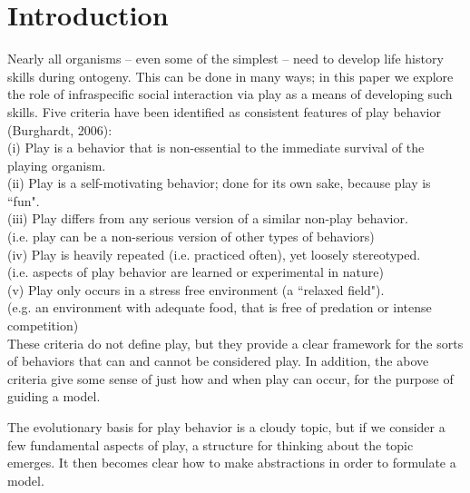 \documentclass[12pt, letterpaper, fleqn]{article}
\begin{document}
\newpage
\section*{Introduction}

\indent
Nearly all organisms -- even some of the simplest -- need to develop life history skills during ontogeny.    This can be done in many ways; in this paper we explore the role of infraspecific social interaction via play as a means of developing such skills. Five criteria have been identified as consistent features of play behavior (Burghardt, 2006): \\[6pt]
(i) Play is a behavior that is non-essential to the immediate survival of the playing organism.\\[.5pt]
(ii) Play is a self-motivating behavior; done for its own sake, because play is ``fun". \\[.5pt]
(iii) Play differs from any serious version of a similar non-play behavior.\\[.1pt]
\indent (i.e. play can be a non-serious version of other types of behaviors) \\[.5pt]
(iv) Play is heavily repeated (i.e. practiced often), yet loosely stereotyped.\\[.1pt]
\indent (i.e. aspects of play behavior are learned or experimental in nature)\\ [.5pt]
(v) Play only occurs in a stress free environment (a ``relaxed field").\\[.1pt] 
\indent (e.g. an environment with adequate food, that is free of predation or intense competition) \\[6pt]
\indent These criteria do not define play, but they provide a clear framework for the sorts of behaviors that can and cannot be considered play. 
In addition, the above criteria give some sense of just how and when play can occur, for the purpose of guiding a model.  

The evolutionary basis for play behavior is a cloudy topic, but if we consider a few fundamental aspects of play, a structure for thinking about the topic emerges. 
It then becomes clear how to make abstractions in order to formulate a model. 
\end{document}
